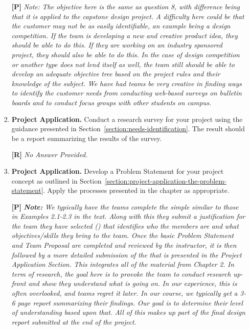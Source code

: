 \begin{enumerate}
  \begin{onlysolution}
  \textbf{[P]}
  \itshape
  \emph{Note:} The objective here is the same as question 8, with difference being that it 
  is applied to the capstone design project. A difficulty here could be that the customer may 
  not be as easily identifiable, an example being a design competition. If the team is developing 
  a new and creative product idea, they should be able to do this. If they are working on an 
  industry sponsored project, they should also be able to do this. In the case of design competition
  or another type does not lend itself as well, the team still should be able to develop an adequate 
  objective tree based on the project rules and their knowledge of the subject. We have had teams be 
  very creative in finding ways to identify the customer needs from conducting web-based surveys on 
  bulletin boards and to conduct focus groups with other students on campus.
  \end{onlysolution}

\item
  \textbf{Project Application.} Conduct a research survey for your
  project using the guidance presented in Section~\ref{section:needs-identification}. The result should
  be a report summarizing the results of the survey.

  \begin{onlysolution}
  \textbf{[R]}
  \itshape
    No Answer Provided.
  \end{onlysolution}

\item
  \textbf{Project Application.} Develop a Problem Statement for your
  project concept as outlined in Section~\ref{section:project-application-the-problem-statement}. 
  Apply the processes presented in the chapter as appropriate.

  \begin{onlysolution}
  \textbf{[P]}
  \itshape
  \textbf{Note:} We typically have the teams complete the simple  similar to those 
  in Examples 2.1-2.3 in the text. Along with this they submit a justification for the team they 
  have selected () that identifies who the members are and what objectives/skills they 
  bring to the team.
  Once the basic Problem Statement and Team Proposal are completed and reviewed by the instructor, 
  it is then followed by a more detailed submission of the  that is presented 
  in the Project Application Section. This integrates all of the material from Chapter 2. In term of 
  research, the goal here is to provoke the team to conduct research up-front and show they understand 
  what is going on. In our experience, this is often overlooked, and teams regret it later. In our course, 
  we typically get a 3-6 page report summarizing their findings. Our goal is to determine their level of 
  understanding based upon that. All of this makes up part of the final design report submitted at the end 
  of the project.



\end{onlysolution}
\end{enumerate}
